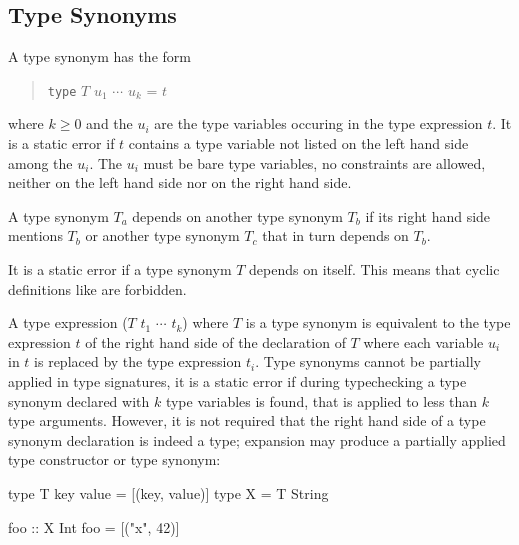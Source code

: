 \begin{flushleft}
    \sym{=}  \bracea{}  \bracez{}
\end{flushleft}

\subsection{Type Synonyms} \label{typedcl} 

\begin{flushleft}
    \sym{=} 
\end{flushleft}

A type synonym has the form
\begin{quote}
\texttt{type} $T$ $u_1$ $\cdots$ $u_k$ = $t$
\end{quote}
where $k\ge 0$ and the $u_i$ are the type variables occuring in the type expression $t$. It is a static error if $t$ contains a type variable not listed on the left hand side among the $u_i$. The $u_i$ must be bare type variables, no constraints are allowed, neither on the left hand side nor on the right hand side.

A type synonym $T_a$ depends on another type synonym $T_b$ if its right hand side mentions $T_b$ or another type synonym $T_c$ that in turn depends on $T_b$.

It is a static error if a type synonym $T$ depends on itself.
This means that cyclic definitions like 
are forbidden.

A type expression ($T$ $t_1$ $\cdots$ $t_k$) where $T$ is a type synonym is equivalent to the type expression $t$ of the right hand side of the declaration of $T$ where each variable $u_i$ in $t$ is replaced by the type expression $t_i$. Type synonyms cannot be partially applied in type signatures, it is a static error if during typechecking a type synonym declared with $k$ type variables is found, that is applied to less than $k$ type arguments. However, it is not required that the right hand side of a type synonym declaration is indeed a type; expansion may produce a partially applied type constructor or type synonym:

\begin{code}
type T key value = [(key, value)]
type X = T String

foo :: X Int
foo = [("x", 42)]
\end{code}

